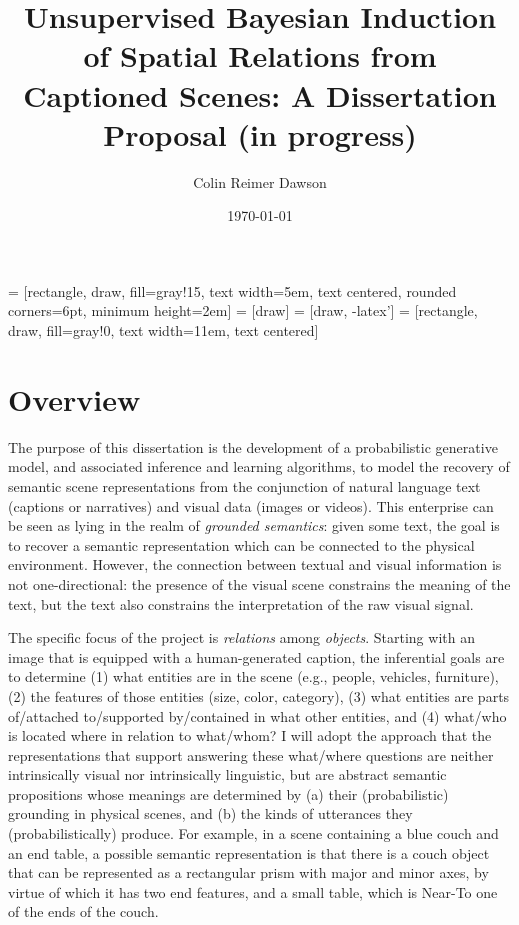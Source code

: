\documentclass[12pt]{article}
\title{Unsupervised Bayesian Induction of Spatial Relations from Captioned Scenes: A Dissertation Proposal (in progress)}
\author{Colin Reimer Dawson}
\date{\today}
\begin{document}
\maketitle

 = [rectangle, draw, fill=gray!15, 
    text width=5em, text centered, rounded corners=6pt, minimum height=2em]
 = [draw]
 = [draw, -latex']
 = [rectangle, draw, fill=gray!0, text width=11em, text centered]

\section{Overview}
\label{sec:overview}

The purpose of this dissertation is the development of a probabilistic generative model, and associated inference and learning algorithms, to model the recovery of semantic scene representations from the conjunction of natural language text (captions or narratives) and visual data (images or videos).  This enterprise can be seen as lying in the realm of {\it grounded semantics}: given some text, the goal is to recover a semantic representation which can be connected to the physical environment.  However, the connection between textual and visual information is not one-directional: the presence of the visual scene constrains the meaning of the text, but the text also constrains the interpretation of the raw visual signal.

The specific focus of the project is {\it relations} among {\it objects}.  Starting with an image that is equipped with a human-generated caption, the inferential goals are to determine (1) what entities are in the scene (e.g., people, vehicles, furniture), (2) the features of those entities (size, color, category), (3) what entities are parts of/attached to/supported by/contained in what other entities, and (4) what/who is located where in relation to what/whom?  I will adopt the approach that the representations that support answering these what/where questions are neither intrinsically visual nor intrinsically linguistic, but are abstract semantic propositions whose meanings are determined by (a) their (probabilistic) grounding in physical scenes, and (b) the kinds of utterances they (probabilistically) produce.  For example, in a scene containing a blue couch and an end table, a possible semantic representation is that there is a {\sc couch} object that can be represented as a rectangular prism with major and minor axes, by virtue of which it has two {\sc end} features, and a small table, which is {\sc Near-To} one of the {\sc ends} of the {\sc couch}.
\end{document}

